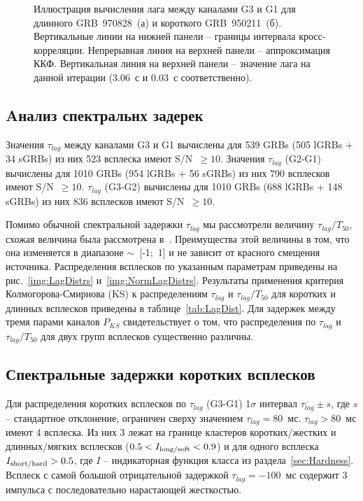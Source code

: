 \begin{figure}[h]
  \begin{minipage}[h]{0.5\textwidth}
  \end{minipage}
  \hfill
  \begin{minipage}[h]{0.5\textwidth}
  \end{minipage}
  \caption{Иллюстрация вычисления лага между каналами G3 и G1 для длинного GRB~970828~(а) и короткого GRB~950211~(б). Вертикальные линии на нижней панели -- границы интервала кросс-корреляции. Непрерывная линия на верхней панели -- аппроксимация ККФ. Вертикальная линия на верхней панели -- значение лага на данной итерации (3.06~с и 0.03~с соответственно).}
  \label{img:lagExample}  
\end{figure}

\subsection{Aнализ спектральнх задерек}
Значения $\tau_{lag}$ между каналами G3 и G1 вычислены для 539 GRBs (505 lGRBs + 34 sGRBs) из них 523 всплеска имеют S/N~$\ge 10$. Значения $\tau_{lag}$ (G2-G1) вычислены для 1010 GRBs (954 lGRBs  + 56 sGRBs) из них 790 всплесков имеют S/N~$\ge 10$. $\tau_{lag}$ (G3-G2) вычислены для 1010 GRBs (688 lGRBs + 148 sGRBs) из них 836 всплесков имеют S/N~$\ge 10$.

Помимо обычной спектральной задержки $\tau_{lag}$ мы рассмотрели величину $\tau_{lag} / T_{50}$, схожая величина была рассмотрена в~\citep{Ripa_2012}. Преимущества этой величины в том, что она изменяется в диапазоне $\sim$~[-1;~1] и не зависит от красного смещения источника.  Распределения всплесков по указанным параметрам приведены на рис.~\ref{img:LagDistrs} и~\ref{img:NormLagDistrs}. Результаты применения критерия Колмогорова-Смирнова (KS) к распределениям $\tau_{lag}$ и $\tau_{lag} / T_{50}$ для коротких и длинных всплесков приведены в таблице~\ref{tab:LagDist}. Для задержек между тремя парами каналов $P_{KS}$ свидетельствует о том, что распределения по $\tau_{lag}$ и $\tau_{lag} / T_{50}$  для двух групп всплесков существенно различны. 

\subsection{Спектральные задержки коротких всплесков}
Для распределения коротких всплесков по $\tau_{lag}$ (G3-G1) 1$\sigma$ интервал $\overline{\tau_{lag}}\pm s$, где $s$ -- стандартное отклонение, ограничен сверху  значением $\tau_{lag}=80$~мс. $\tau_{lag} > 80$~мс  имеют 4 всплеска. Из них 3 лежат на границе кластеров коротких/жестких и длинных/мягких всплесков ($0.5<I_{\mbox{\scriptsize long/soft}}<0.9$) и для одного всплеска $I_{\mbox{\scriptsize short/hard}}>0.5$, где $I$ -- индикаторная функция класса из раздела~\ref{sec:Hardness}. Всплеск с самой большой отрицательной задержкой $\tau_{lag}=-100$~мс содержит 3 импульса с последовательно нарастающей жесткостью. 

